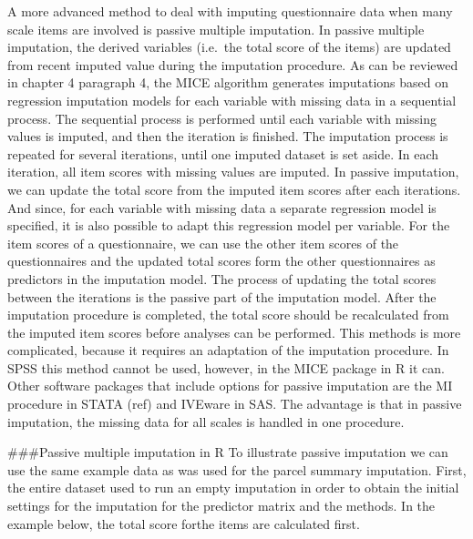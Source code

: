 \documentclass[
]{book}
\begin{document}
A more advanced method to deal with imputing questionnaire data when
many scale items are involved is passive multiple imputation. In passive
multiple imputation, the derived variables (i.e.~the total score of the
items) are updated from recent imputed value during the imputation
procedure. As can be reviewed in chapter 4 paragraph 4, the MICE
algorithm generates imputations based on regression imputation models
for each variable with missing data in a sequential process. The
sequential process is performed until each variable with missing values
is imputed, and then the iteration is finished. The imputation process
is repeated for several iterations, until one imputed dataset is set
aside. In each iteration, all item scores with missing values are
imputed. In passive imputation, we can update the total score from the
imputed item scores after each iterations. And since, for each variable
with missing data a separate regression model is specified, it is also
possible to adapt this regression model per variable. For the item
scores of a questionnaire, we can use the other item scores of the
questionnaires and the updated total scores form the other
questionnaires as predictors in the imputation model. The process of
updating the total scores between the iterations is the passive part of
the imputation model. After the imputation procedure is completed, the
total score should be recalculated from the imputed item scores before
analyses can be performed. This methods is more complicated, because it
requires an adaptation of the imputation procedure. In SPSS this method
cannot be used, however, in the MICE package in R it can. Other software
packages that include options for passive imputation are the MI
procedure in STATA (ref) and IVEware in SAS. The advantage is that in
passive imputation, the missing data for all scales is handled in one
procedure.

\#\#\#Passive multiple imputation in R To illustrate passive imputation
we can use the same example data as was used for the parcel summary
imputation. First, the entire dataset used to run an empty imputation in
order to obtain the initial settings for the imputation for the
predictor matrix and the methods. In the example below, the total score
forthe items are calculated first.
\end{document}
